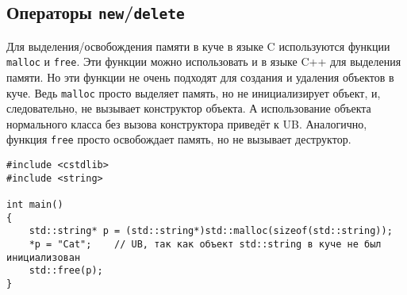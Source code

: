\documentclass{article}
\begin{document}
\subsection*{Операторы \texttt{new}/\texttt{delete}}
Для выделения/освобождения памяти в куче в языке C используются функции \texttt{malloc} и \texttt{free}. Эти функции можно использовать и в языке C++ для выделения памяти. Но эти функции не очень подходят для создания и удаления объектов в куче. Ведь \texttt{malloc} просто выделяет память, но не инициализирует объект, и, следовательно, не вызывает конструктор объекта. А использование объекта нормального класса без вызова конструктора приведёт к UB. Аналогично, функция \texttt{free} просто освобождает память, но не вызывает деструктор.
\begin{lstlisting}
#include <cstdlib>
#include <string>

int main()
{
	std::string* p = (std::string*)std::malloc(sizeof(std::string));
	*p = "Cat";    // UB, так как объект std::string в куче не был инициализован
	std::free(p);
}
\end{lstlisting}
\end{document}
